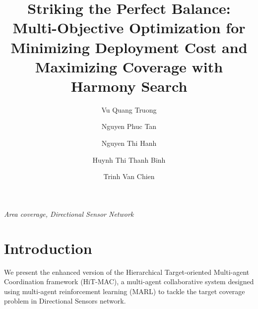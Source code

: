 \documentclass[preprint,12pt]{elsarticle}
\begin{document}
\newtheorem{theorem}{Theorem}[section]
\newtheorem{corollary}{Corollary}[theorem]
\newtheorem{lemma}[theorem]{Lemma}

\begin{frontmatter}

\title{Striking the Perfect Balance: Multi-Objective Optimization for Minimizing Deployment Cost and Maximizing Coverage with Harmony Search}

\author[group1]{Vu Quang Truong}
\author[group1]{Nguyen Phuc Tan} 
\author[group2]{Nguyen Thi Hanh}
\author[group1]{Huynh Thi Thanh Binh}
\author[group1]{Trinh Van Chien}
\address[group1]{Hanoi University of Science and Technology, Vietnam}
\address[group2]{Faculty of Interdisciplinary Digital Technology (FIDT), PHENIKAA University, Yen Nghia, Ha Dong, Hanoi 12116, Vietnam}

\begin{abstract}


\end{abstract}

\begin{keyword}
\textit{Area coverage, Directional Sensor Network}
\end{keyword}

\end{frontmatter}


\section{Introduction}
We present the enhanced version of the Hierarchical Target-oriented Multi-agent Coordination framework (HiT-MAC), a multi-agent collaborative system designed using multi-agent reinforcement learning (MARL) to tackle the target coverage problem in Directional Sensors network.
\end{document}
